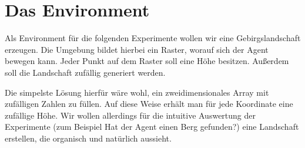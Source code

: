\section{Das Environment}

Als Environment für die folgenden Experimente wollen wir eine Gebirgslandschaft erzeugen. Die Umgebung bildet hierbei ein Raster, worauf sich der Agent bewegen kann. Jeder Punkt auf dem Raster soll eine Höhe besitzen. Außerdem soll die Landschaft zufällig generiert werden.

Die simpelste Lösung hierfür wäre wohl, ein zweidimensionales Array mit zufälligen Zahlen zu füllen. Auf diese Weise erhält man für jede Koordinate eine zufällige Höhe. Wir wollen allerdings für die intuitive Auswertung der Experimente (zum Beispiel \glqq Hat der Agent einen Berg gefunden?\grqq) eine Landschaft erstellen, die organisch und natürlich aussieht.


